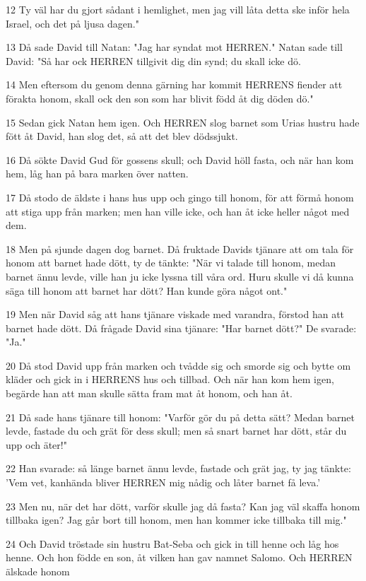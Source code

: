 \par 12 Ty väl har du gjort sådant i hemlighet, men jag vill låta detta ske inför hela Israel, och det på ljusa dagen."
\par 13 Då sade David till Natan: "Jag har syndat mot HERREN." Natan sade till David: "Så har ock HERREN tillgivit dig din synd; du skall icke dö.
\par 14 Men eftersom du genom denna gärning har kommit HERRENS fiender att förakta honom, skall ock den son som har blivit född åt dig döden dö."
\par 15 Sedan gick Natan hem igen. Och HERREN slog barnet som Urias hustru hade fött åt David, han slog det, så att det blev dödssjukt.
\par 16 Då sökte David Gud för gossens skull; och David höll fasta, och när han kom hem, låg han på bara marken över natten.
\par 17 Då stodo de äldste i hans hus upp och gingo till honom, för att förmå honom att stiga upp från marken; men han ville icke, och han åt icke heller något med dem.
\par 18 Men på sjunde dagen dog barnet. Då fruktade Davids tjänare att om tala för honom att barnet hade dött, ty de tänkte: "När vi talade till honom, medan barnet ännu levde, ville han ju icke lyssna till våra ord. Huru skulle vi då kunna säga till honom att barnet har dött? Han kunde göra något ont."
\par 19 Men när David såg att hans tjänare viskade med varandra, förstod han att barnet hade dött. Då frågade David sina tjänare: "Har barnet dött?" De svarade: "Ja."
\par 20 Då stod David upp från marken och tvådde sig och smorde sig och bytte om kläder och gick in i HERRENS hus och tillbad. Och när han kom hem igen, begärde han att man skulle sätta fram mat åt honom, och han åt.
\par 21 Då sade hans tjänare till honom: "Varför gör du på detta sätt? Medan barnet levde, fastade du och grät för dess skull; men så snart barnet har dött, står du upp och äter!"
\par 22 Han svarade: så länge barnet ännu levde, fastade och grät jag, ty jag tänkte: 'Vem vet, kanhända bliver HERREN mig nådig och låter barnet få leva.'
\par 23 Men nu, när det har dött, varför skulle jag då fasta? Kan jag väl skaffa honom tillbaka igen? Jag går bort till honom, men han kommer icke tillbaka till mig."
\par 24 Och David tröstade sin hustru Bat-Seba och gick in till henne och låg hos henne. Och hon födde en son, åt vilken han gav namnet Salomo. Och HERREN älskade honom
